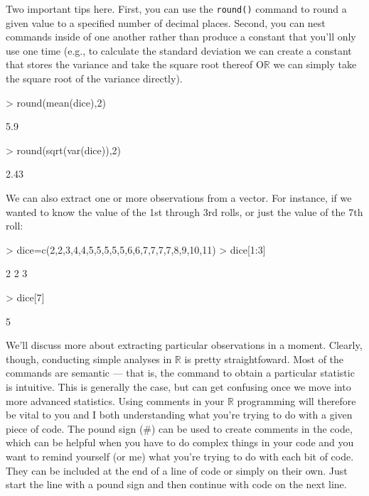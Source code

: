 \documentclass[12pt]{article}
\begin{document}
Two important tips here. First, you can use the \verb|round()| command to round a given value to a specified number of decimal places. Second, you can nest commands inside of one another rather than produce a constant that you'll only use one time (e.g., to calculate the standard deviation we can create a constant that stores the variance and take the square root thereof O$\mathbb{R}$ we can simply take the square root of the variance directly).
\begin{Schunk}
\begin{Sinput}
> round(mean(dice),2)
\end{Sinput}
\begin{Soutput}
[1] 5.9
\end{Soutput}
\begin{Sinput}
> round(sqrt(var(dice)),2)
\end{Sinput}
\begin{Soutput}
[1] 2.43
\end{Soutput}
\end{Schunk}

We can also extract one or more observations from a vector. For instance, if we wanted to know the value of the 1st through 3rd rolls, or just the value of the 7th roll:
\begin{Schunk}
\begin{Sinput}
> dice=c(2,2,3,4,4,5,5,5,5,5,6,6,7,7,7,7,8,9,10,11)
> dice[1:3]
\end{Sinput}
\begin{Soutput}
[1] 2 2 3
\end{Soutput}
\begin{Sinput}
> dice[7]
\end{Sinput}
\begin{Soutput}
[1] 5
\end{Soutput}
\end{Schunk}
We'll discuss more about extracting particular observations in a moment. Clearly, though, conducting simple analyses in $\mathbb{R}$ is pretty straightfoward. Most of the commands are semantic --- that is, the command to obtain a particular statistic is intuitive. This is generally the case, but can get confusing once we move into more advanced statistics. Using comments in your $\mathbb{R}$ programming will therefore be vital to you and I both understanding what you're trying to do with a given piece of code. The pound sign (\#) can be used to create comments in the code, which can be helpful when you have to do complex things in your code and you want to remind yourself (or me) what you're trying to do with each bit of code. They can be included at the end of a line of code or simply on their own. Just start the line with a pound sign and then continue with code on the next line.
\end{document}
